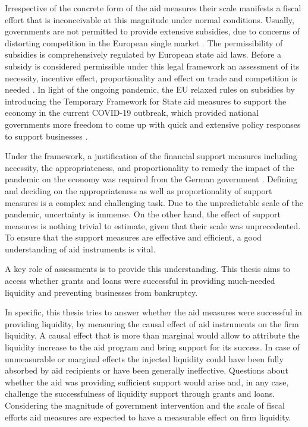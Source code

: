 Irrespective of the concrete form of the aid measures their scale manifests a fiscal effort that is inconceivable at this magnitude under normal conditions. Usually, governments are not permitted to provide extensive subsidies, due to concerns of distorting competition in the European single market \parencite{claici_european_2022}. The permissibility of subsidies is comprehensively regulated by European state aid laws. Before a subsidy is considered permissible under this legal framework an assessment of its necessity, incentive effect, proportionality and effect on trade and competition is needed \parencite{claici_european_2022}. In light of the ongoing pandemic, the EU relaxed rules on subsidies by introducing the Temporary Framework for State aid measures to support the economy in the current COVID-19 outbreak, which provided national governments more freedom to come up with quick and extensive policy responses to support businesses \parencite{eu_com_temporary_2020}.

Under the framework, a justification of the financial support measures including  necessity, the appropriateness, and proportionality to remedy the impact of the pandemic on the economy was required from the German government \parencite{eu_com_temporary_2020}. Defining and deciding on the appropriateness as well as proportionality of support measures is a complex and challenging task. Due to the unpredictable scale of the pandemic, uncertainty is immense. On the other hand, the effect of support measures is nothing trivial to estimate, given that their scale was unprecedented. To ensure that the support measures are effective and efficient, a good understanding of aid instruments is vital. 

A key role of assessments is to provide this understanding. This thesis aims to access whether grants and loans were successful in providing much-needed liquidity and preventing businesses from bankruptcy.

In specific, this thesis tries to answer whether the aid measures were successful in providing liquidity, by measuring the causal effect of aid instruments on the firm liquidity. A causal effect that is more than marginal would allow to attribute the liquidity increase to the aid program and bring support for its success. In case of unmeasurable or marginal effects the injected liquidity could have been fully absorbed by aid recipients or have been generally ineffective. Questions about whether the aid was providing sufficient support 
would arise and, in any case, challenge the successfulness of liquidity support through grants and loans. Considering the magnitude of government intervention and the scale of fiscal efforts aid measures are expected to have a measurable effect on firm liquidity.


